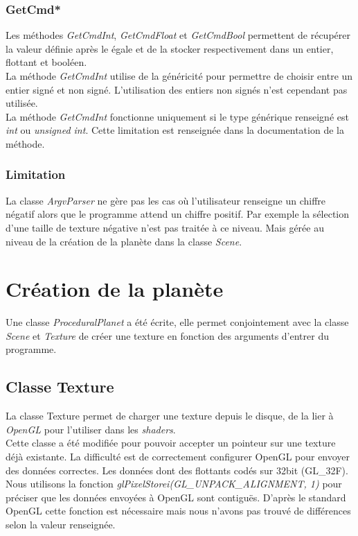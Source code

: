    \subsubsection{GetCmd*}
    Les méthodes \textit{GetCmdInt}, \textit{GetCmdFloat} et \textit{GetCmdBool} permettent de récupérer la valeur définie après le égale et de la stocker respectivement dans un entier, flottant et booléen.\\
    
    La méthode \textit{GetCmdInt} utilise de la généricité pour permettre de choisir entre un entier signé et non signé. L'utilisation des entiers non signés n'est cependant pas utilisée.\\
    
    La méthode \textit{GetCmdInt} fonctionne uniquement si le type générique renseigné est \textit{int} ou \textit{unsigned int}. Cette limitation est renseignée dans la documentation de la méthode.
    
  \subsubsection{Limitation}
    
    La classe \textit{ArgvParser} ne gère pas les cas où l'utilisateur renseigne un chiffre négatif alors que le programme attend un chiffre positif. Par exemple la sélection d'une taille de texture négative
    n'est pas traitée à ce niveau. Mais gérée au niveau de la création de la planète dans la classe \textit{Scene}.
  
  \section{Création de la planète}
  Une classe \textit{ProceduralPlanet} a été écrite, elle permet conjointement avec la classe \textit{Scene} et \textit{Texture} de créer une texture en fonction des arguments d'entrer du programme.
  
  \subsection{Classe Texture}
  \label{sec:class_texture}
  La classe Texture permet de charger une texture depuis le disque, de la lier à \textit{OpenGL} pour l'utiliser dans les \textit{shaders}.\\
  
  Cette classe a été modifiée pour pouvoir accepter un pointeur sur une texture déjà existante. 
  La difficulté est de correctement configurer OpenGL pour envoyer des données correctes. Les données dont des flottants codés sur 32bit (GL\_32F).\\
  Nous utilisons la fonction \textit{glPixelStorei(GL\_UNPACK\_ALIGNMENT, 1)} pour préciser que les données envoyées à OpenGL sont contiguës. D'après le standard OpenGL cette fonction est nécessaire mais 
  nous n'avons pas trouvé de différences selon la valeur renseignée.
  
